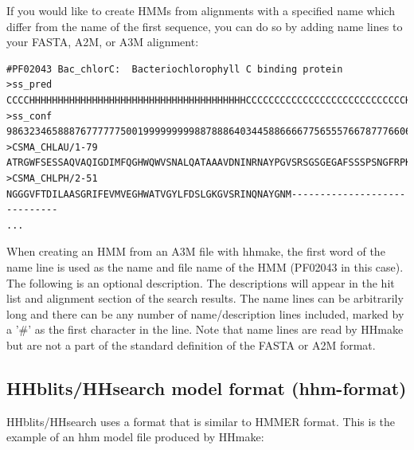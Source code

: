 \documentclass[11pt,a4paper]{article}
\begin{document}
If you would like to create HMMs from alignments with a specified name which differ 
from the name of the first sequence, you can do so by adding name lines to 
your FASTA, A2M, or A3M alignment:

\scriptsize\begin{verbatim}
#PF02043 Bac_chlorC:  Bacteriochlorophyll C binding protein
>ss_pred
CCCCHHHHHHHHHHHHHHHHHHHHHHHHHHHHHHHHHHHHHHCCCCCCCCCCCCCCCCCCCCCCCCCCCCHHHHHHHCC
>ss_conf
9863234658887677777750019999999998878886403445886666775655576678777660667633039
>CSMA_CHLAU/1-79
ATRGWFSESSAQVAQIGDIMFQGHWQWVSNALQATAAAVDNINRNAYPGVSRSGSGEGAFSSSPSNGFRPKRIRSRFNR
>CSMA_CHLPH/2-51
NGGGVFTDILAASGRIFEVMVEGHWATVGYLFDSLGKGVSRINQNAYGNM-----------------------------
...
\end{verbatim}\normalsize

When creating an HMM from an A3M file with hhmake, the first word of the name line is 
used as the name and file name of the HMM (PF02043 in this case). The following is an 
optional description. The descriptions will appear in the hit list and alignment section 
of the search results. The name lines can be arbitrarily long and there can be any number of 
name/description lines included, marked by a '\#' as the first character in the line. 
Note that name lines are read by HHmake but are not a part of the standard definition
of the FASTA or A2M format.
 

\subsection{HHblits/HHsearch model format (hhm-format)}

HHblits/HHsearch uses a format that is similar to HMMER format. 
This is the example of an hhm model file produced by HHmake:
\end{document}
